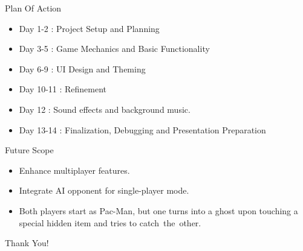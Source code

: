 \documentclass{beamer}
\begin{document}
\begin{frame}{Plan Of Action}
        \begin{itemize}
                \item Day 1-2   : Project Setup and Planning
		\item Day 3-5   : Game Mechanics and Basic Functionality
                \item Day 6-9   : UI Design and Theming 
                \item Day 10-11 : Refinement
                \item Day 12    : Sound effects and background music.
		\item Day 13-14 : Finalization, Debugging and Presentation Preparation
        \end{itemize}
\end{frame}


\begin{frame}{Future Scope}
	\begin{itemize}
		\item Enhance multiplayer features.
		\item Integrate AI opponent for single-player mode. 
		\item Both players start as Pac-Man, but one turns into a ghost upon touching a special hidden item and tries to catch the other.
	\end{itemize}
\end{frame}

\begin{frame}
    \centering
    \vfill
    \Huge Thank You!
    \vfill
\end{frame}
\end{document}
